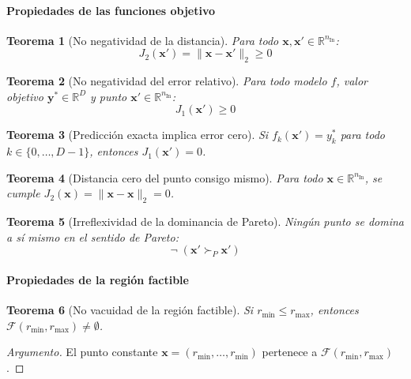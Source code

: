 \documentclass[12pt]{report} %
\newtheorem{theorem}{Teorema}
\begin{document}
\paragraph{Propiedades de las funciones objetivo}

\begin{theorem}[No negatividad de la distancia]\label{thm:cf-j2-nonneg}
    Para todo $\mathbf{x}, \mathbf{x}' \in \mathbb{R}^{n_{\text{In}}}$:
    $$J_2(\mathbf{x}') = \|\mathbf{x} - \mathbf{x}'\|_2 \geq 0$$
\end{theorem}

\begin{theorem}[No negatividad del error relativo]\label{thm:cf-j1-nonneg}
    Para todo modelo $\hat{f}$, valor objetivo $\mathbf{y}^* \in \mathbb{R}^D$ y punto $\mathbf{x}' \in \mathbb{R}^{n_{\text{In}}}$:
    $$J_1(\mathbf{x}') \geq 0$$
\end{theorem}

\begin{theorem}[Predicción exacta implica error cero]\label{thm:cf-j1-zero-exact}
    Si $f_k(\mathbf{x}') = y^*_k$ para todo $k \in \{0, \ldots, D-1\}$, entonces $J_1(\mathbf{x}') = 0$.
\end{theorem}

\begin{theorem}[Distancia cero del punto consigo mismo]\label{thm:cf-j2-zero-self}
    Para todo $\mathbf{x} \in \mathbb{R}^{n_{\text{In}}}$, se cumple $J_2(\mathbf{x}) = \|\mathbf{x} - \mathbf{x}\|_2 = 0$.
\end{theorem}

\begin{theorem}[Irreflexividad de la dominancia de Pareto]\label{thm:cf-pareto-irrefl}
    Ningún punto se domina a sí mismo en el sentido de Pareto:
    $$\neg\;(\mathbf{x}' \succ_P \mathbf{x}')$$
\end{theorem}

\paragraph{Propiedades de la región factible}

\begin{theorem}[No vacuidad de la región factible]\label{thm:cf-feasible-nonempty}
    Si $r_{\min} \leq r_{\max}$, entonces $\mathcal{F}(r_{\min}, r_{\max}) \neq \emptyset$.
\end{theorem}
\begin{proof}[Argumento]
    El punto constante $\mathbf{x} = (r_{\min}, \ldots, r_{\min})$ pertenece a $\mathcal{F}(r_{\min}, r_{\max})$.
\end{proof}
\end{document}
